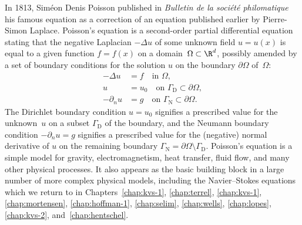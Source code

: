 In 1813, Sim\'eon Denis Poisson published in \emph{Bulletin de la
soci\'et\'e philomatique} his famous equation as a correction of
an equation published earlier by Pierre-Simon Laplace. Poisson's
equation is a second-order partial differential equation stating that
the negative Laplacian $-\Delta u$ of some unknown field $u = u(x)$ is
equal to a given function $f = f(x)$ on a domain~$\Omega \subset \R^d$,
possibly amended by a set of boundary conditions for the solution $u$
on the boundary $\partial \Omega$ of~$\Omega$:
\begin{equation} \label{eq:poisson}
  \begin{split}
    - \Delta u &= f \quad \mbox{in } \Omega,
    \\
    u &= u_0 \quad \mbox{on } \Gamma_{\mathrm{D}} \subset \partial \Omega,
    \\
    - \partial_n u &= g \quad \mbox{on } \Gamma_{\mathrm{N}} \subset \partial \Omega.
  \end{split}
\end{equation}
The Dirichlet boundary condition $u = u_0$ signifies a prescribed
value for the unknown~$u$ on a subset $\Gamma_{\mathrm{D}}$ of the
boundary, and the Neumann boundary condition $-\partial_n u = g$
signifies a prescribed value for the (negative) normal derivative of
$u$ on the remaining boundary $\Gamma_{\mathrm{N}} = \partial \Omega
\setminus \Gamma_{\mathrm{D}}$. Poisson's equation is a simple model
for gravity, electromagnetism, heat transfer, fluid flow, and many
other physical processes. It also appears as the basic building block
in a large number of more complex physical models, including the
Navier--Stokes equations which we return to in
Chapters~\ref{chap:kvs-1}, \ref{chap:terrel}, \ref{chap:kvs-1},
\ref{chap:mortensen}, \ref{chap:hoffman-1}, \ref{chap:selim},
\ref{chap:wells}, \ref{chap:lopes}, \ref{chap:kvs-2},
and~\ref{chap:hentschel}.

